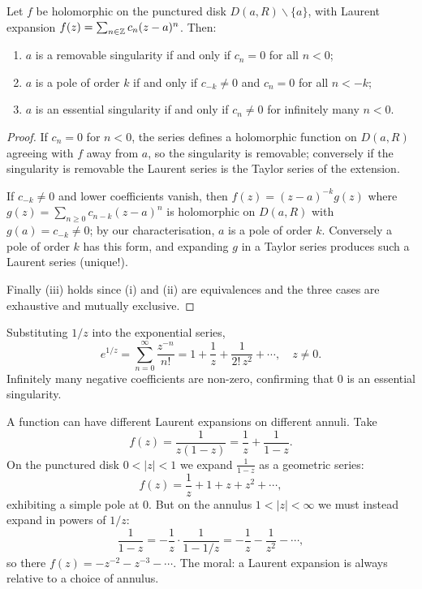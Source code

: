 \documentclass[a4paper]{scrartcl}
\begin{document}
\begin{proposition}
    Let $f$ be holomorphic on the punctured disk $D(a, R) \backslash \{a\}$, with Laurent expansion $f(z) = \sum_{n \in \mathbb{Z}} c_n(z - a)^n$. Then:
    \begin{enumerate}[label=(\roman*)]
        \item $a$ is a removable singularity if and only if $c_n = 0$ for all $n < 0$;
        \item $a$ is a pole of order $k$ if and only if $c_{-k} \neq 0$ and $c_n = 0$ for all $n < -k$;
        \item $a$ is an essential singularity if and only if $c_n \neq 0$ for infinitely many $n < 0$.
    \end{enumerate}
\end{proposition}
\begin{proof}
    If $c_n = 0$ for $n < 0$, the series defines a holomorphic function on $D(a, R)$ agreeing with $f$ away from $a$, so the singularity is removable; conversely if the singularity is removable the Laurent series is the Taylor series of the extension.

    If $c_{-k} \neq 0$ and lower coefficients vanish, then $f(z) = (z - a)^{-k}g(z)$ where $g(z) = \sum_{n \geq 0} c_{n - k}(z - a)^{n}$ is holomorphic on $D(a, R)$ with $g(a) = c_{-k} \neq 0$; by our characterisation, $a$ is a pole of order $k$. Conversely a pole of order $k$ has this form, and expanding $g$ in a Taylor series produces such a Laurent series (unique!).

    Finally (iii) holds since (i) and (ii) are equivalences and the three cases are exhaustive and mutually exclusive.
\end{proof}

\begin{example}
    Substituting $1/z$ into the exponential series,
    $$
    e^{1/z} = \sum_{n = 0}^{\infty} \frac{z^{-n}}{n!} = 1 + \frac{1}{z} + \frac{1}{2! \, z^2} + \cdots, \quad z \neq 0.
    $$
    Infinitely many negative coefficients are non-zero, confirming that $0$ is an essential singularity.
\end{example}

\begin{example}
    A function can have different Laurent expansions on different annuli. Take
    $$
    f(z) = \frac{1}{z(1 - z)} = \frac{1}{z} + \frac{1}{1 - z}.
    $$
    On the punctured disk $0 < |z| < 1$ we expand $\frac{1}{1 - z}$ as a geometric series:
    $$
    f(z) = \frac{1}{z} + 1 + z + z^2 + \cdots,
    $$
    exhibiting a simple pole at $0$. But on the annulus $1 < |z| < \infty$ we must instead expand in powers of $1/z$:
    $$
    \frac{1}{1 - z} = -\frac{1}{z} \cdot \frac{1}{1 - 1/z} = -\frac{1}{z} - \frac{1}{z^2} - \cdots,
    $$
    so there $f(z) = -z^{-2} - z^{-3} - \cdots$. The moral: a Laurent expansion is always relative to a choice of annulus.
\end{example}
\end{document}
